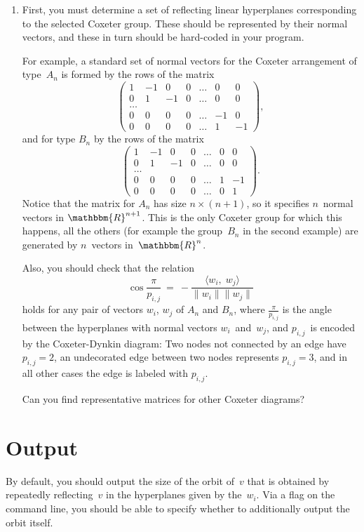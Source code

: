 \documentclass[11pt]{amsart}
\newcommand{\R}{\mathbbm{R}}
\begin{document}
\begin{enumerate}
\item First, you must determine a set of reflecting linear hyperplanes corresponding to the selected Coxeter group. These should be represented by their normal vectors, and these in turn should be hard-coded in your program.

For example, a standard set of normal vectors for the Coxeter arrangement of type~$A_n$ is formed by the rows of the matrix
\[
  \begin{pmatrix}
     1 & -1 &  0 & 0 &\dots &  0 &  0 \\
     0 &  1 & -1 & 0 &\dots &  0 &  0 \\
     \dots\\
     0 &  0 &  0 & 0 &\dots & -1 & 0 \\
     0 &  0 &  0 & 0 &\dots &  1 & -1
   \end{pmatrix},
\]
and for type $B_n$ by the rows of the matrix
\[
  \begin{pmatrix}
     1 & -1 &  0 & 0 &\dots & 0 & 0\\
     0 &  1 & -1 & 0 &\dots & 0 & 0\\
     \dots\\
     0 &  0 &  0 & 0 &\dots & 1 & -1\\
     0 &  0 &  0 & 0 &\dots & 0 & 1
   \end{pmatrix}.
\]
Notice that the matrix for $A_n$ has size $n\times(n+1)$, so it specifies $n$~normal vectors in $\R^{n+1}$. This is the only Coxeter group for which this happens, all the others (for example the group~$B_n$ in the second example) are generated by $n$~vectors in~$\R^n$. 

Also, you should check that the relation
\[
   \cos\frac{\pi}{p_{i,j}}
   \ = \
   -\frac{\langle w_i, \; w_j\rangle}{\|w_i\|\|w_j\|}
\]
holds for any pair of vectors $w_i$, $w_j$ of $A_n$ and $B_n$, where $\frac{\pi}{p_{i,j}}$ is the angle between the hyperplanes with normal vectors $w_i$~and~$w_j$, and $p_{i,j}$~is encoded by the Coxeter-Dynkin diagram: Two nodes not connected by an edge have $p_{i,j}=2$, an undecorated edge between two nodes represents $p_{i,j}=3$, and in all other cases the edge is labeled with $p_{i,j}$.

Can you find representative matrices for other Coxeter diagrams?
\end{enumerate}

\section{Output}

By default, you should output the size of the orbit of~$v$ that is obtained by repeatedly reflecting~$v$ in the hyperplanes given by the~$w_i$. Via a flag on the command line, you should be able to specify whether to additionally output the orbit itself.
\end{document}
